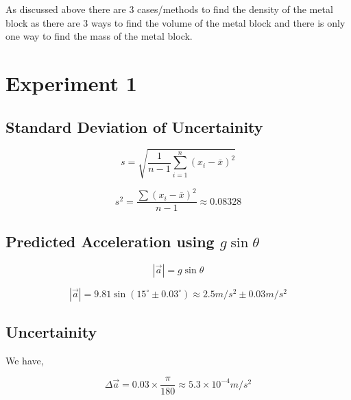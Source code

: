 
{As discussed above there are 3 cases/methods to find the density of the metal block as there are 3 ways to find the volume of the metal block and there is only one way to find the mass of the metal block.}

\section{{Experiment 1}}

	\subsection{{Standard Deviation of Uncertainity}}

		{}
		
			$$s = \sqrt{\frac{1}{n - 1}\sum_{i = 1}^{n}{\left(x_{i} - \bar{x}\right)}^2}$$
			
			$$s^2 = \frac{\sum{\left(x_{i} - \bar{x}\right)}^2}{n - 1} \approx 0.08328$$

	\subsection{{Predicted Acceleration using $g\sin\theta$}}

		{}
		
			$$\left|\overrightarrow{a}\right| = g\sin\theta$$

			$$\left|\overrightarrow{a}\right| = 9.81\sin\left(15^{\circ} \pm 0.03^{\circ}\right) \approx 2.5 m/s^2 \pm 0.03 m/s^2$$

	\subsection{{Uncertainity}}

	{We have,}

		$$\Delta \overrightarrow{a} = 0.03 \times \frac{\pi}{180} \approx 5.3\times 10^{-4} m/s^2$$

